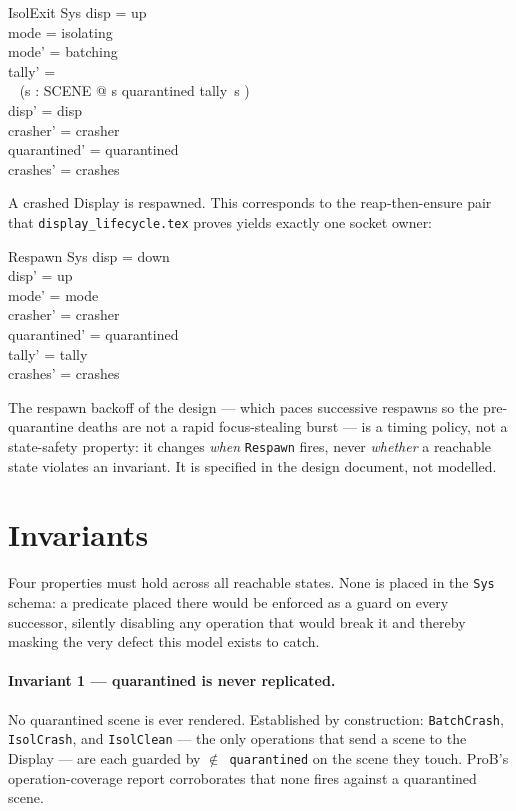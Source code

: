 \documentclass[a4paper,10pt,fleqn]{article}
\begin{document}
\begin{schema}{IsolExit}
  \Delta Sys
\where
  disp = up \\
  mode = isolating \\
  mode' = batching \\
  tally' = \\
  \quad~ (\lambda s : SCENE @ \IF s \in quarantined \THEN tally~s ) \\
  disp' = disp \\
  crasher' = crasher \\
  quarantined' = quarantined \\
  crashes' = crashes
\end{schema}

A crashed Display is respawned.  This corresponds to the reap-then-ensure pair
that \texttt{display\_lifecycle.tex} proves yields exactly one socket owner:

\begin{schema}{Respawn}
  \Delta Sys
\where
  disp = down \\
  disp' = up \\
  mode' = mode \\
  crasher' = crasher \\
  quarantined' = quarantined \\
  tally' = tally \\
  crashes' = crashes
\end{schema}

The respawn backoff of the design --- which paces successive respawns so the
pre-quarantine deaths are not a rapid focus-stealing burst --- is a timing
policy, not a state-safety property: it changes \emph{when} \texttt{Respawn}
fires, never \emph{whether} a reachable state violates an invariant.  It is
specified in the design document, not modelled.

\section{Invariants}
\label{sec:inv}

Four properties must hold across all reachable states.  None is placed in the
\texttt{Sys} schema: a predicate placed there would be enforced as a guard on
every successor, silently disabling any operation that would break it and thereby
masking the very defect this model exists to catch.

\paragraph{Invariant 1 --- quarantined is never replicated.}
No quarantined scene is ever rendered.  Established by construction:
\texttt{BatchCrash}, \texttt{IsolCrash}, and \texttt{IsolClean} --- the only
operations that send a scene to the Display --- are each guarded by
\texttt{$\notin$ quarantined} on the scene they touch.  ProB's operation-coverage
report corroborates that none fires against a quarantined scene.
\end{document}
